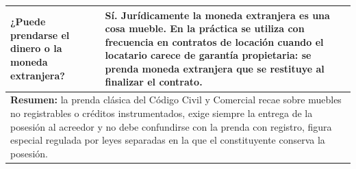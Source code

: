 \documentclass[12pt,oneside]{book}
\begin{document}
\begin{longtable}{p{}p{}}
\textbf{¿Puede prendarse el dinero o la moneda extranjera?} &
Sí. Jurídicamente la moneda extranjera es una cosa mueble. En la práctica se utiliza con frecuencia en contratos de locación cuando el locatario carece de garantía propietaria: se prenda moneda extranjera que se restituye al finalizar el contrato. \\

\midrule
\multicolumn{2}{p{\dimexpr0.93\textwidth+2\tabcolsep\relax}}{%
\textbf{Resumen:} la prenda clásica del Código Civil y Comercial recae sobre muebles no registrables o créditos instrumentados, exige siempre la entrega de la posesión al acreedor y no debe confundirse con la prenda con registro, figura especial regulada por leyes separadas en la que el constituyente conserva la posesión.} \\
\bottomrule
\end{longtable}
\end{document}
